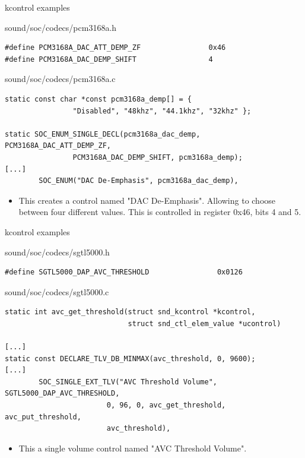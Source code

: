 \begin{frame}[fragile]{kcontrol examples}
  \begin{block}{sound/soc/codecs/pcm3168a.h}
    \fontsize{9}{9}\selectfont
    \begin{verbatim}
#define PCM3168A_DAC_ATT_DEMP_ZF                0x46
#define PCM3168A_DAC_DEMP_SHIFT                 4
    \end{verbatim}
  \end{block}
  \begin{block}{sound/soc/codecs/pcm3168a.c}
    \fontsize{9}{9}\selectfont
    \begin{verbatim}
static const char *const pcm3168a_demp[] = {
                "Disabled", "48khz", "44.1khz", "32khz" };

static SOC_ENUM_SINGLE_DECL(pcm3168a_dac_demp, PCM3168A_DAC_ATT_DEMP_ZF,
                PCM3168A_DAC_DEMP_SHIFT, pcm3168a_demp);
[...]
        SOC_ENUM("DAC De-Emphasis", pcm3168a_dac_demp),
    \end{verbatim}
  \end{block}
  \begin{itemize}
  \item This creates a control named "DAC De-Emphasis". Allowing to
    choose between four different values.
    This is controlled in register 0x46, bits 4 and 5.
  \end{itemize}
\end{frame}

\begin{frame}[fragile]{kcontrol examples}
  \begin{block}{sound/soc/codecs/sgtl5000.h}
    \fontsize{9}{9}\selectfont
    \begin{verbatim}
#define SGTL5000_DAP_AVC_THRESHOLD                0x0126
    \end{verbatim}
  \end{block}
  \begin{block}{sound/soc/codecs/sgtl5000.c}
    \fontsize{9}{9}\selectfont
    \begin{verbatim}
static int avc_get_threshold(struct snd_kcontrol *kcontrol,
                             struct snd_ctl_elem_value *ucontrol)

[...]
static const DECLARE_TLV_DB_MINMAX(avc_threshold, 0, 9600);
[...]
        SOC_SINGLE_EXT_TLV("AVC Threshold Volume", SGTL5000_DAP_AVC_THRESHOLD,
                        0, 96, 0, avc_get_threshold, avc_put_threshold,
                        avc_threshold),
    \end{verbatim}
  \end{block}
  \begin{itemize}
  \item This a single volume control named "AVC Threshold Volume".
  \end{itemize}
\end{frame}

